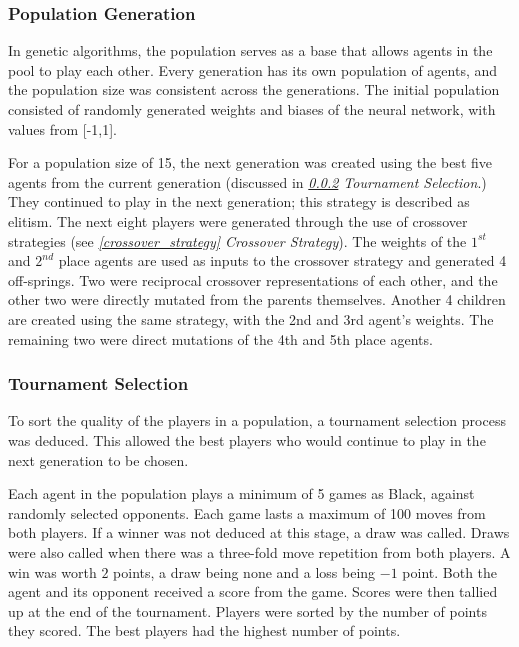 \documentclass[12pt,a4paper]{article}
\begin{document}
        \subsubsection{Population Generation} \label{population_generation}
            In genetic algorithms, the population serves as a base that allows agents in the pool to play each other. Every generation has its own population of agents, and the population size was consistent across the generations. The initial population consisted of randomly generated weights and biases of the neural network, with values from [-1,1]. 
            
            For a population size of 15, the next generation was created using the best five agents from the current generation (discussed in {\it{\ref{tournament_selection} Tournament Selection}}.) They continued to play in the next generation; this strategy is described as elitism. The next eight players were generated through the use of crossover strategies (see {\it{\ref{crossover_strategy} Crossover Strategy}}). The weights of the $1^{st}$ and $2^{nd}$ place agents are used as inputs to the crossover strategy and generated 4 off-springs. Two were reciprocal crossover representations of each other, and the other two were directly mutated from the parents themselves. Another 4 children are created using the same strategy, with the 2nd and 3rd agent's weights. The remaining two were direct mutations of the 4th and 5th place agents.

        \subsubsection{Tournament Selection} \label{tournament_selection}

            To sort the quality of the players in a population, a tournament selection process was deduced. This allowed the best players who would continue to play in the next generation to be chosen.

            Each agent in the population plays a minimum of 5 games as Black, against randomly selected opponents. Each game lasts a maximum of 100 moves from both players. If a winner was not deduced at this stage, a draw was called. Draws were also called when there was a three-fold move repetition from both players. A win was worth $2$ points, a draw being none and a loss being $-1$ point. Both the agent and its opponent received a score from the game.
            Scores were then tallied up at the end of the tournament. Players were sorted by the number of points they scored. The best players had the highest number of points.
  
\end{document}
